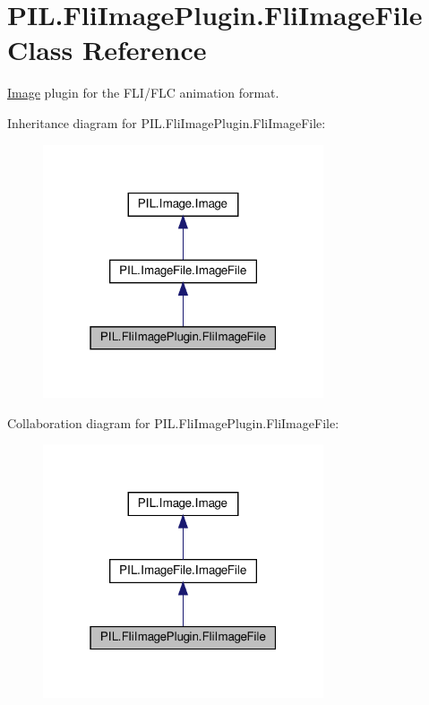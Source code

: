 \hypertarget{classPIL_1_1FliImagePlugin_1_1FliImageFile}{}\section{P\+I\+L.\+Fli\+Image\+Plugin.\+Fli\+Image\+File Class Reference}
\label{classPIL_1_1FliImagePlugin_1_1FliImageFile}


\hyperlink{namespacePIL_1_1Image}{Image} plugin for the F\+L\+I/\+F\+LC animation format.  




Inheritance diagram for P\+I\+L.\+Fli\+Image\+Plugin.\+Fli\+Image\+File\+:
\nopagebreak
\begin{figure}[H]
\begin{center}
\leavevmode
\includegraphics[width=235pt]{classPIL_1_1FliImagePlugin_1_1FliImageFile__inherit__graph}
\end{center}
\end{figure}


Collaboration diagram for P\+I\+L.\+Fli\+Image\+Plugin.\+Fli\+Image\+File\+:
\nopagebreak
\begin{figure}[H]
\begin{center}
\leavevmode
\includegraphics[width=235pt]{classPIL_1_1FliImagePlugin_1_1FliImageFile__coll__graph}
\end{center}
\end{figure}
